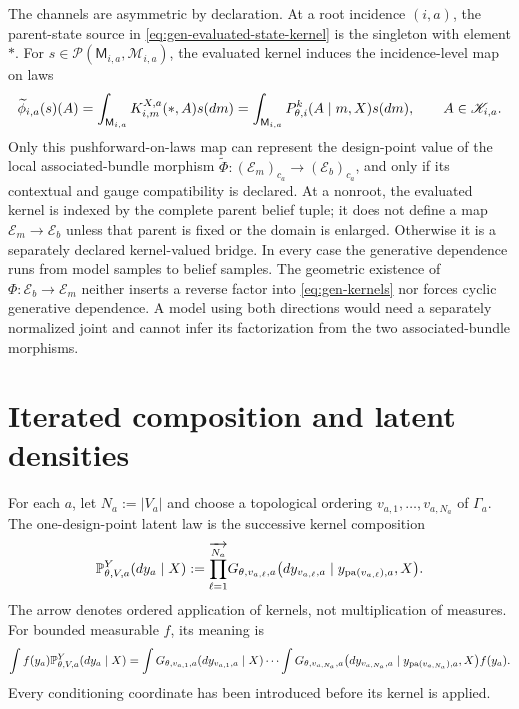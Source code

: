 The channels are asymmetric by declaration. At a root incidence \((i,a)\), the
parent-state source in \eqref{eq:gen-evaluated-state-kernel} is the singleton
with element $\ast$. For
\(s\in\mathcal P(\mathsf M_{i,a},\mathscr M_{i,a})\), the evaluated kernel
induces the incidence-level map on laws
\begin{equation}
\widetilde\phi_{i,a}(s)(A)
=\int_{\mathsf M_{i,a}}K^{X,a}_{i,m}(\ast,A)s(dm)
=\int_{\mathsf M_{i,a}}P_{\theta,i}^{k}(A\mid m,X)s(dm),
\qquad A\in\mathscr K_{i,a}.
\label{eq:gen-root-law-bridge}
\end{equation}
Only this pushforward-on-laws map can represent the design-point value of the
local associated-bundle morphism
$\widetilde\Phi:(\mathcal E_m)_{c_a}\to(\mathcal E_b)_{c_a}$, and only if its
contextual and gauge compatibility is declared. At a nonroot, the evaluated
kernel is indexed by the complete parent
belief tuple; it
does not define a map $\mathcal E_m\to\mathcal E_b$ unless that parent is fixed or the domain is
enlarged.  Otherwise it is a separately declared kernel-valued bridge.  In every case the
generative dependence runs from model samples to belief samples.  The geometric existence of
$\Phi:\mathcal E_b\to\mathcal E_m$ neither inserts a reverse factor into
\eqref{eq:gen-kernels} nor forces cyclic generative dependence.  A model using both directions
would need a separately normalized joint and cannot infer its factorization from the two
associated-bundle morphisms.

\section{Iterated composition and latent densities}
\label{sec:gen-composition}

For each $a$, let $N_a:=|V_a|$ and choose a topological ordering
$v_{a,1},\dots,v_{a,N_a}$ of $\Gamma_a$. The one-design-point latent law is the
successive kernel composition
\begin{equation}
\mathbb P_{\theta,V,a}^{Y}(dy_a\mid X)
:=\overrightarrow{\prod_{\ell=1}^{N_a}}
G_{\theta,v_{a,\ell},a}
\bigl(dy_{v_{a,\ell},a}\mid y_{\operatorname{pa}(v_{a,\ell}),a},X\bigr).
\label{eq:gen-composition}
\end{equation}
The arrow denotes ordered application of kernels, not multiplication of measures. For bounded
measurable $f$, its meaning is
\begin{equation}
\int f(y_a)\mathbb P_{\theta,V,a}^{Y}(dy_a\mid X)
=\int G_{\theta,v_{a,1},a}(dy_{v_{a,1},a}\mid X)\cdots
\int G_{\theta,v_{a,N_a},a}
\bigl(dy_{v_{a,N_a},a}\mid y_{\operatorname{pa}(v_{a,N_a}),a},X\bigr)f(y_a).
\label{eq:gen-iterated-integral}
\end{equation}
Every conditioning coordinate has been introduced before its kernel is applied.

